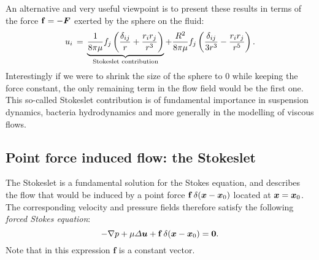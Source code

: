An alternative and very useful viewpoint is to present these results in terms of the force $\mathbf f=-\bF$ exerted by the sphere on the fluid:
\begin{equation}
u_i \,=\, \underbrace{\frac{1}{8 \pi\mu}f_j\left(\frac{\delta_{ij}}{r}+\frac{r_ir_j}{r^3}\right)}_\text{Stokeslet contribution} +\frac{R^2}{8\pi\mu}f_j\left(\frac{\delta_{ij}}{3r^3}-\frac{r_ir_j}{r^5}\right).
\label{eq:stokes_force_sphere}
\end{equation}
Interestingly if we were to shrink the size of the sphere to 0 while keeping the force constant, the only remaining term in the flow field would be the first one. This so-called Stokeslet contribution is of fundamental importance in suspension dynamics, bacteria hydrodynamics and more generally in the modelling of viscous flows.
\subsection{Point force induced flow: the Stokeslet}
The Stokeslet is a fundamental solution for the Stokes equation, and describes the flow that would be induced by a point force $\mathbf f\, \delta(\bx-\bx_0)$ located at $\bx = \bx_0$. The corresponding velocity and pressure fields therefore satisfy the following \textit{forced Stokes equation}:
\begin{equation}
-\nabla p + \mu \Delta \bu + \mathbf f \,\delta(\bx-\bx_0) = \matrixsym 0.
\label{eq:forced_stokes_equation}
\end{equation}
Note that in this expression $\mathbf f$ is a constant vector. 

